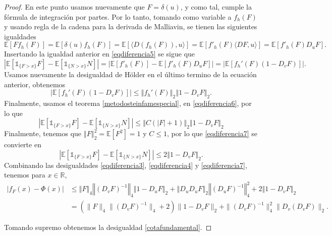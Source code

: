 \documentclass[letterpaper,twoside,12pt]{book}
\newcommand{\R}{\mathbb{R}}
\newcommand{\E}{\mathbb{E}}
\newcommand{\1}{\mathds{1}}
\newcommand{\abs}[1]{\left\lvert #1 \right\rvert}
\newcommand{\norm}[1]{\left\Vert #1 \right\Vert}
\theoremstyle{definition}
\theoremstyle{definition}
\theoremstyle{remark}
\theoremstyle{definition}
\theoremstyle{definition}
\theoremstyle{definition}
\theoremstyle{definition}
\theoremstyle{definition}
\begin{document}
\begin{proof}
En este punto usamos nuevamente que $F=\delta(u)$, y como tal, cumple la fórmula de integración por partes. Por lo tanto, tomando como variable a $f_h(F)$ y usando regla de la cadena para la derivada de Malliavin, se tienen las siguientes igualdades
\begin{equation*}
   \E\left[Ff_h(F)\right]=\E\left[\delta(u)f_h(F)\right]=\E\left[\langle D(f_h(F)),u\rangle\right]=\E\left[f'_h(F)\langle DF,u\rangle\right]=\E\left[f'_h(F)D_uF\right].
\end{equation*}
Insertando la igualdad anterior en \eqref{eqdiferencia5} se sigue que 
   \begin{equation*}
      \abs{\E\left[\1_{\{F>x\}}F\right]-\E\left[\1_{\{N>x\}}N\right]}=\abs{\E\left[f'_h(F)\right]-\E\left[f'_h(F)D_uF\right]}= \abs{\E\left[f_h'(F)(1-D_vF)\right]}.
   \end{equation*}
Usamos nuevamente la desigualdad de Hölder en el último termino de la ecuación anterior, obtenemos
\begin{equation}\label{eqdiferencia6}
   \abs{\E\left[f_h'(F)(1-D_vF)\right]}\leq \norm{f_h'(F)}_2\norm{1-D_vF}_2.
\end{equation}
Finalmente, usamos el teorema \ref{metodosteinfamespecial}, en \eqref{eqdiferencia6}, por lo que 
\begin{equation}\label{eqdiferencia7}
      \abs{\E\left[\1_{\{F>x\}}F\right]-\E\left[\1_{\{N>x\}}N\right]}\leq \norm{C(\abs{F}+1)}_2\norm{1-D_vF}_2
\end{equation}
Finalmente, tenemos que $\norm{F}_2^2 = \E\left[F^2\right] = 1$ y $C\leq 1$, por lo que \eqref{eqdiferencia7} se convierte en 
\begin{equation}\label{eqdiferencia8}
   \abs{\E\left[\1_{\{F>x\}}F\right]-\E\left[\1_{\{N>x\}}N\right]}\leq2\norm{1-D_vF}_2.
\end{equation}
Combinando las desigualdades \eqref{eqdiferencia3}, \eqref{eqdiferencia4} y \eqref{eqdiferencia7}, tenemos para $x\in \R$,
\begin{align*}
   \abs{f_F(x)-\Phi(x)}&\leq \norm{F}_4\norm{(D_vF)^{-1}}_4\norm{1-D_uF}_2+\norm{D_uD_uF}_2\norm{(D_uF)^{-1}}_4^{2}+2\norm{1-D_vF}_2\\
   &=\left(\|F\|_4\|\left(D_vF\right)^{-1}\|_4+2\right)\|1-D_vF\|_2+\|\left(D_vF\right)^{-1}\|_4^{2}\|D_v \left(D_vF\right)\|_2.   
\end{align*}

Tomando supremo obtenemos la desigualdad \eqref{cotafundamental}.
\end{proof}
\end{document}
